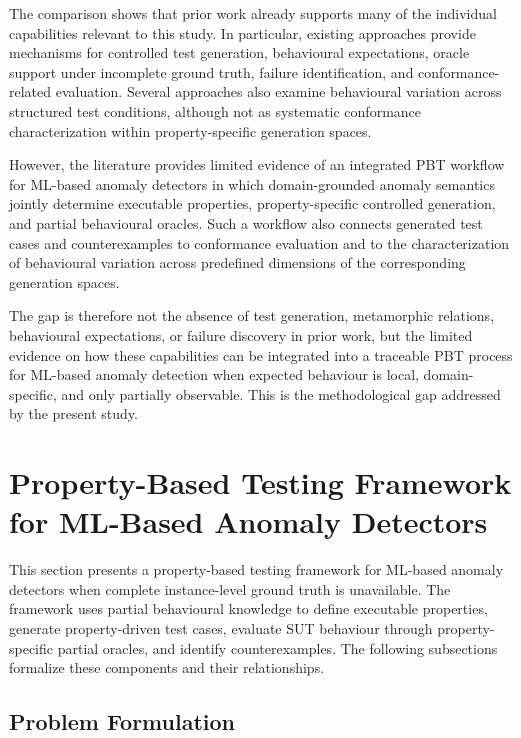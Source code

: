 \documentclass[preprint,12pt]{elsarticle}
\begin{document}
The comparison shows that prior work already supports many of the individual
capabilities relevant to this study. In particular, existing approaches
provide mechanisms for controlled test generation, behavioural expectations,
oracle support under incomplete ground truth, failure identification, and
conformance-related evaluation. Several approaches also examine behavioural
variation across structured test conditions, although not as systematic
conformance characterization within property-specific generation spaces.

However, the literature provides limited evidence of an integrated PBT
workflow for ML-based anomaly detectors in which domain-grounded anomaly
semantics jointly determine executable properties, property-specific
controlled generation, and partial behavioural oracles. Such a workflow also
connects generated test cases and counterexamples to conformance evaluation
and to the characterization of behavioural variation across predefined
dimensions of the corresponding generation spaces.

The gap is therefore not the absence of test generation, metamorphic
relations, behavioural expectations, or failure discovery in prior work, but
the limited evidence on how these capabilities can be integrated into a
traceable PBT process for ML-based anomaly detection when expected behaviour
is local, domain-specific, and only partially observable. This is the
methodological gap addressed by the present study.

\section{Property-Based Testing Framework for ML-Based Anomaly Detectors}
\label{sec:framework}

This section presents a property-based testing framework for ML-based anomaly
detectors when complete instance-level ground truth is unavailable. The
framework uses partial behavioural knowledge to define executable properties,
generate property-driven test cases, evaluate SUT behaviour through
property-specific partial oracles, and identify counterexamples. The following
subsections formalize these components and their relationships.

\subsection{Problem Formulation}
\label{sec:problem_formulation}
\end{document}
